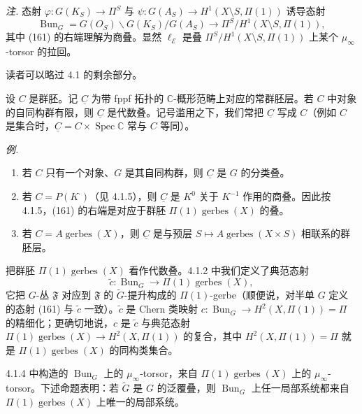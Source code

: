 \emph{注.} 态射 $\varphi:G(K_S)\to\Pi^S$ 与 $\psi:G(A_S)\to H^1(X\setminus S,\Pi(1))$ 诱导态射
\begin{equation}\tag{161}
\operatorname{Bun}_G=G(O_S)\backslash G(K_S)/G(A_S)\to\Pi^S/H^1(X\setminus S,\Pi(1)),
\end{equation}
其中 (161) 的右端理解为商叠。显然 $\ell_{\mathcal{E}}$ 是叠 $\Pi^S/H^1(X\setminus S,\Pi(1))$ 上某个 $\mu_\infty$-torsor 的拉回。

 读者可以略过 4.1 的剩余部分。

设 $C$ 是群胚。记 $\underline{C}$ 为带 fppf 拓扑的 $\mathbb{C}$-概形范畴上对应的常群胚层。若 $C$ 中对象的自同构群有限，则 $\underline{C}$ 是代数叠。记号滥用之下，我们常把 $\underline{C}$ 写成 $C$（例如 $C$ 是集合时，$\underline{C}=C\times\operatorname{Spec}\mathbb{C}$ 常与 $C$ 等同）。

\emph{例.}
\begin{enumerate}[label=\arabic*),leftmargin=2.2em]
\item 若 $C$ 只有一个对象、$G$ 是其自同构群，则 $\underline{C}$ 是 $G$ 的分类叠。
\item 若 $C=P(K^{\cdot})$（见 4.1.5），则 $\underline{C}$ 是 $K^0$ 关于 $K^{-1}$ 作用的商叠。因此按 4.1.5，(161) 的右端是对应于群胚 $\Pi(1)\operatorname{gerbes}(X)$ 的叠。
\item 若 $C=A\operatorname{gerbes}(X)$，则 $\underline{C}$ 是与预层 $S\mapsto A\operatorname{gerbes}(X\times S)$ 相联系的群胚层。
\end{enumerate}

把群胚 $\Pi(1)\operatorname{gerbes}(X)$ 看作代数叠。4.1.2 中我们定义了典范态射
\begin{equation}\tag{162}
\tilde c:\operatorname{Bun}_G\to\Pi(1)\operatorname{gerbes}(X),
\end{equation}
它把 $G$-丛 $\mathfrak{F}$ 对应到 $\mathfrak{F}$ 的 $\tilde G$-提升构成的 $\Pi(1)$-gerbe（顺便说，对半单 $G$ 定义的态射 (161) 与 $\tilde c$ 一致）。$\tilde c$ 是 Chern 类映射 $c:\operatorname{Bun}_G\to H^2(X,\Pi(1))=\Pi$ 的精细化；更确切地说，$c$ 是 $\tilde c$ 与典范态射 $\Pi(1)\operatorname{gerbes}(X)\to H^2(X,\Pi(1))$ 的复合，其中 $H^2(X,\Pi(1))=\Pi$ 就是 $\Pi(1)\operatorname{gerbes}(X)$ 的同构类集合。

4.1.4 中构造的 $\operatorname{Bun}_G$ 上的 $\mu_\infty$-torsor，来自 $\Pi(1)\operatorname{gerbes}(X)$ 上的 $\mu_\infty$-torsor。下述命题表明：若 $\tilde G$ 是 $G$ 的泛覆叠，则 $\operatorname{Bun}_G$ 上任一局部系统都来自 $\Pi(1)\operatorname{gerbes}(X)$ 上唯一的局部系统。

